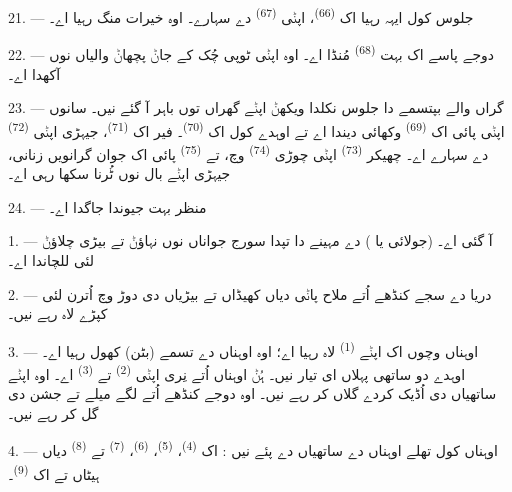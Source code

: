 \VUsaut{4.6mm}
\VUsaut{3.4mm}

21. --- جلوس کول ایہہ رہیا اک  \textsuperscript{(66)}، اپݨی
 \textsuperscript{(67)} دے سہارے۔ اوہ خیرات منگ رہیا اے۔

22. --- دوجے پاسے اک بہت  \textsuperscript{(68)} مُنڈا اے۔ اوہ
اپݨی ٹوپی چُک کے جاݨ پچھاݨ والیاں نوں  آکھدا اے۔

23. --- گراں والے بپتسمے دا جلوس نکلدا ویکھݨ اپݨے گھراں توں باہر آ گئے نیں۔
سانوں اپݨی  پائی اک  \textsuperscript{(69)}
وکھائی دیندا اے تے اوہدے کول اک  \textsuperscript{(70)}۔ فیر
اک  \textsuperscript{(71)}، جیہڑی اپݨی 
\textsuperscript{(72)} دے سہارے اے۔ چھیکر  \textsuperscript{(73)}
اپݨی چوڑی  \textsuperscript{(74)} وچ، تے 
\textsuperscript{(75)} پائی اک جوان گرانویں زنانی، جیہڑی اپݨے بال نوں ٹُرنا سکھا
رہی اے۔

24. --- منظر بہت جیوندا جاگدا اے۔
\VUsaut{4.0mm}

\VUsaut{3.0mm}

\VUsaut{2.4mm}

\VUsaut{3.0mm}

1. ---  آ گئی اے۔  (جولائی یا ) دے مہینے
دا تپدا سورج جواناں نوں نہاؤݨ تے بیڑی چلاؤݨ لئی للچاندا اے۔

2. --- دریا دے سجے کنڈھے اُتے ملاح پاݨی دیاں کھیڈاں تے بیڑیاں دی دوڑ وچ اُترن
لئی کپڑے لاہ رہے نیں۔

3. --- اوہناں وچوں اک اپݨے  \textsuperscript{(1)} لاہ رہیا اے؛ اوہ
اوہناں دے تسمے (بٹن) کھول رہیا اے۔ اوہدے دو ساتھی پہلاں ای تیار نیں۔ ہُݨ اوہناں
اُتے نِری اپݨی  \textsuperscript{(2)} تے 
\textsuperscript{(3)} اے۔ اوہ اپݨے ساتھیاں دی اُڈیک کردے گلاں کر رہے نیں۔ اوہ
دوجے کنڈھے اُتے لگے میلے تے جشن دی گل کر رہے نیں۔

4. --- اوہناں کول تھلے اوہناں دے ساتھیاں دے  پئے نیں : اک
  \textsuperscript{(4)}، 
\textsuperscript{(5)}،  \textsuperscript{(6)}، 
\textsuperscript{(7)} تے  \textsuperscript{(8)} دیاں ہیٹاں تے اک
 \textsuperscript{(9)}۔

